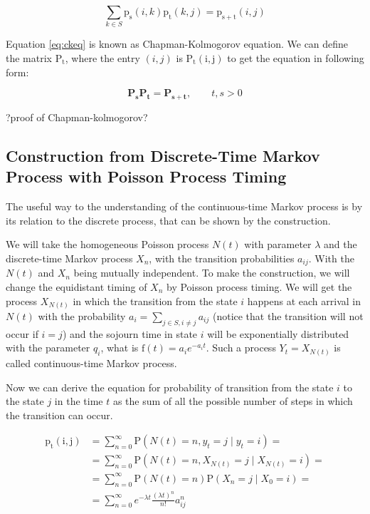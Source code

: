 \documentclass[thesis=M,english]{FITthesis}[2012/10/20]
\newcommand{\matr}[1]{\mathbf{#1}}
\begin{document}
\begin{equation}\label{eq:ckeq}
\sum_{k \in S}\mathrm{p_s}(i,k)\mathrm{p_t}(k,j) = \mathrm{p_{s+t}}(i,j)     
\end{equation}

Equation \eqref{eq:ckeq} is known as Chapman-Kolmogorov equation. 
We can define the matrix $\mathrm{P_t}$, where the entry $(i,j)$ is $\mathrm{P_t(i,j)}$ to get the equation in following form:

\begin{equation}\label{eq:ckm}
\matr{P_s} \matr{P_t} = \matr{P_{s+t}},   \qquad t,s > 0  
\end{equation}

?proof of Chapman-kolmogorov?


\subsection{Construction from Discrete-Time Markov Process with Poisson Process Timing } 

The useful way to the understanding of the continuous-time Markov process is by its relation to the discrete process, that can be shown by the construction.

We will take the homogeneous Poisson process $N(t)$ with parameter $\lambda$ and the discrete-time Markov process $X_n$, with the transition probabilities $a_{ij}$. With the $N(t)$ and $X_n$ being mutually independent. To make the construction, we will change the equidistant timing of $X_n$ by Poisson process timing. We will get the process $X_{N(t)}$ in which the transition from the state $i$ happens at each arrival in $N(t)$ with the probability $a_i = \sum_{j\in S, i\neq j} a_{ij}$ (notice that the transition will not occur if $i=j$) and the sojourn time in state $i$ will be exponentially distributed with the parameter $q_i$, what is $\mathrm{f}(t)= a_i e^{-a_i t}$. Such a process $Y_t = X_{N(t)}$ is called continuous-time Markov process.

Now we can derive the equation for probability of transition from the state $i$ to the state $j$ in the time $t$ as the sum of all the possible number of steps in which the transition can occur. 

\begin{equation}
\begin{aligned}
\mathrm{p_t(i,j)} &= \sum_{n=0}^{\infty} \mathrm{P}( N(t) = n, y_t = j \mid y_t = i )  = \\
                  &= \sum_{n=0}^{\infty} \mathrm{P}( N(t) = n, X_{N(t)} = j \mid X_{N(t)} = i )  = \\
                  &= \sum_{n=0}^{\infty} \mathrm{P}( N(t) = n ) \mathrm{P}( X_n = j \mid X_0 = i )  = \\
				  &= \sum_{n=0}^{\infty} e^{-\lambda t} \frac{ (\lambda t)^n}{n!} a_{ij}^n  
\end{aligned}
\end{equation} 
\end{document}
